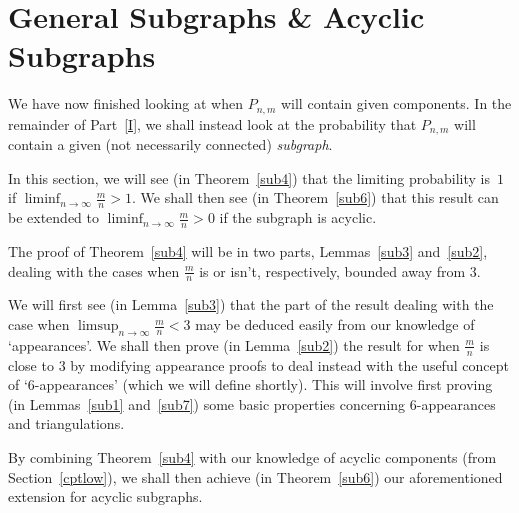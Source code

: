 \documentclass{article}
\newtheorem{Proof of Theorem}{Proof of Theorem}
\begin{document}
\newpage
\section{General Subgraphs \& Acyclic Subgraphs} \label{sub}















We have now finished looking at when $P_{n,m}$ will contain given components.
In the remainder of Part~\ref{I},
we shall instead look at the probability that $P_{n,m}$ will contain a given 
(not necessarily connected) \textit{subgraph}.

In this section, we will see (in Theorem~\ref{sub4}) that the limiting probability is~$1$ 
if $\liminf_{n \to \infty} \frac{m}{n} > 1$.
We shall then see (in Theorem~\ref{sub6})
that this result can be extended to $\liminf_{n \to \infty} \frac{m}{n} > 0$ if the subgraph is acyclic.

The proof of Theorem~\ref{sub4} will be in two parts, Lemmas~\ref{sub3} and~\ref{sub2},
dealing with the cases when $\frac{m}{n}$ is or isn't, respectively, bounded away from $3$.

We will first see (in Lemma~\ref{sub3}) that the part of the result dealing with the case when 
$\limsup_{n \to \infty} \frac{m}{n} < 3$ 
may be deduced easily from our knowledge of `appearances'.
We shall then prove (in Lemma~\ref{sub2}) the result for when $\frac{m}{n}$ is close to $3$ by modifying
appearance proofs to deal instead with the useful concept of `$6$-appearances'
(which we will define shortly).
This will involve first proving (in Lemmas~\ref{sub1} and~\ref{sub7})
some basic properties concerning $6$-appearances and triangulations.

By combining Theorem~\ref{sub4} with our knowledge of acyclic components
(from Section~\ref{cptlow}),
we shall then achieve (in Theorem~\ref{sub6}) our aforementioned extension for acyclic subgraphs.
\end{document}

